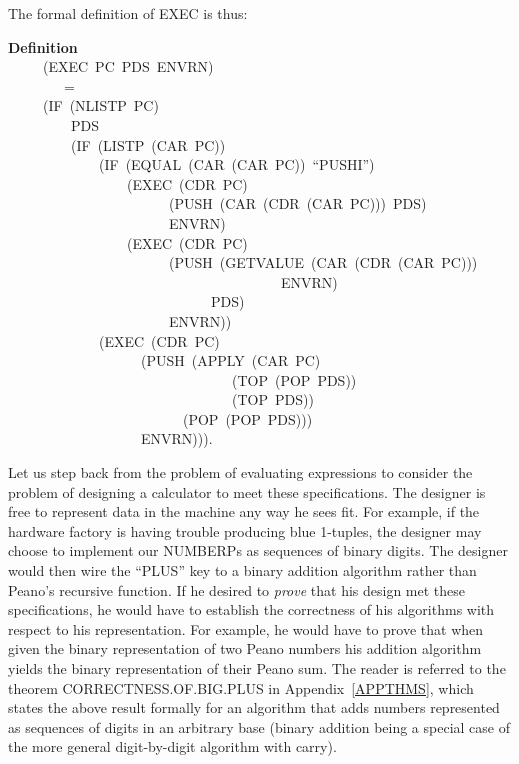\documentclass[10pt]{book}
\newenvironment{pubasis}{\begin{flushleft}}{\end{flushleft}}
\newcommand{\axiomordefinition}[1]{\vspace{6pt}\Large\textsf{\textbf{#1}}\normalsize}
\begin{document}
The formal definition of EXEC is thus:
\begin{pubasis}
\axiomordefinition{Definition}\\
~~~~~(EXEC~PC~PDS~ENVRN)\\
~~~~~~~~=\\
~~~~~(IF~(NLISTP~PC)\\
~~~~~~~~~PDS\\
~~~~~~~~~(IF~(LISTP~(CAR~PC))\\
~~~~~~~~~~~~~(IF~(EQUAL~(CAR~(CAR~PC))~``PUSHI'')\\
~~~~~~~~~~~~~~~~~(EXEC~(CDR~PC)\\
~~~~~~~~~~~~~~~~~~~~~~~(PUSH~(CAR~(CDR~(CAR~PC)))~PDS)\\
~~~~~~~~~~~~~~~~~~~~~~~ENVRN)\\
~~~~~~~~~~~~~~~~~(EXEC~(CDR~PC)\\
~~~~~~~~~~~~~~~~~~~~~~~(PUSH~(GETVALUE~(CAR~(CDR~(CAR~PC)))\\
~~~~~~~~~~~~~~~~~~~~~~~~~~~~~~~~~~~~~~~ENVRN)\\
~~~~~~~~~~~~~~~~~~~~~~~~~~~~~PDS)\\
~~~~~~~~~~~~~~~~~~~~~~~ENVRN))\\
~~~~~~~~~~~~~(EXEC~(CDR~PC)\\
~~~~~~~~~~~~~~~~~~~(PUSH~(APPLY~(CAR~PC)\\
~~~~~~~~~~~~~~~~~~~~~~~~~~~~~~~~(TOP~(POP~PDS))\\
~~~~~~~~~~~~~~~~~~~~~~~~~~~~~~~~(TOP~PDS))\\
~~~~~~~~~~~~~~~~~~~~~~~~~(POP~(POP~PDS)))\\
~~~~~~~~~~~~~~~~~~~ENVRN))).\\
\end{pubasis}
Let us step back from the problem of evaluating
expressions to consider the problem of
designing a calculator to meet these specifications.
The designer is free to
represent data in the machine any way he sees fit.
For example, if the hardware factory is having trouble producing blue 1-tuples,
the designer
may choose to implement our NUMBERPs as sequences of binary digits.
The designer would then wire the ``PLUS'' key to a binary addition algorithm
rather than Peano's recursive function.  If he desired to \emph{prove}
that his design met these specifications,
he would have to establish the correctness of his
algorithms with respect to his representation.
For example, he would have to prove that when given
the binary representation of two Peano numbers his addition algorithm
yields the binary representation of their Peano sum.
The reader is referred to the theorem
CORRECTNESS.OF.BIG.PLUS in Appendix~\ref{APPTHMS}, which states the above
result formally for an algorithm that adds numbers represented as sequences
of digits in an arbitrary base (binary addition being a special case
of the more general digit-by-digit algorithm with carry).
\end{document}
